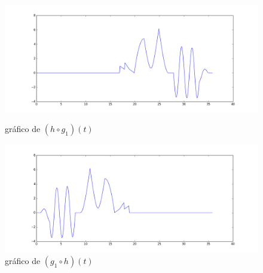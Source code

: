 \documentclass[12pt]{article}
\begin{document}
\begin{figure}[!h]
	\centering
	\begin{minipage}[b]{0.49\linewidth}
		\includegraphics[width=1.15\linewidth]{hog1.png}
		\caption{gráfico de $(h\circ g_1)(t)$}
	\end{minipage}
	\hfill
	\begin{minipage}[b]{0.49\linewidth}
		\includegraphics[width=1.15\linewidth]{g1oh.png}
		\caption{gráfico de $(g_1\circ h)(t)$}
	\end{minipage}
\end{figure}
\end{document}

